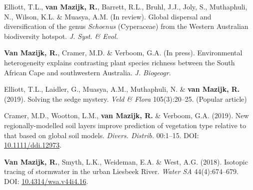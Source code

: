 \begin{hangparas}{2em}{1}

Elliott, T.L., \textbf{van Mazijk, R.}, Barrett, R.L., Bruhl, J.J., Joly, S.,
Muthaphuli, N., Wilson, K.L. \& Muasya, A.M. (In review). Global dispersal and
diversification of the genus \textit{Schoenus} (Cyperaceae) from the Western
Australian biodiversity hotspot. \textit{J. Syst. \& Evol.}

\textbf{Van Mazijk, R.}, Cramer, M.D. \& Verboom, G.A. (In press).
Environmental heterogeneity explains contrasting plant species richness between
the South African Cape and southwestern Australia. \textit{J. Biogeogr.}

Elliott, T.L., Laidler, G., Muasya, A.M., Muthaphuli, N. \& \textbf{van Mazijk,
R.} (2019). Solving the sedge mystery. \textit{Veld \& Flora} 105(3):20--25.
(Popular article)

Cramer, M.D., Wootton, L.M., \textbf{van Mazijk, R.} \& Verboom, G.A. (2019).
New regionally-modelled soil layers improve prediction of vegetation type
relative to that based on global soil models. \textit{Divers. Distrib.}
00:1--15. DOI: \href{https://doi.org/10.1111/ddi.12973}{10.1111/ddi.12973}.

\textbf{Van Mazijk, R.}, Smyth, L.K., Weideman, E.A. \& West, A.G. (2018).
Isotopic tracing of stormwater in the urban Liesbeek River. \textit{Water SA}
44(4):674--679. DOI:
\href{https://doi.org/10.4314/wsa.v44i4.16}{10.4314/wsa.v44i4.16}.

\end{hangparas}
